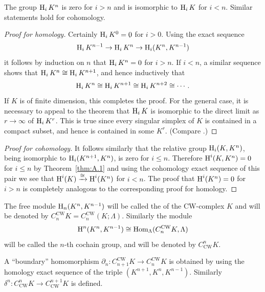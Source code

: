 \documentclass[../main]{subfiles}
\begin{document}
\begin{corollary}\label{cor:A.3}
The group $\operatorname{H}_i K^n$ is zero for $i>n$ and is isomorphic to $\operatorname{H}_i K$ for $i<n$. Similar statements hold for cohomology.
\end{corollary}

\begin{proof}[Proof for homology]
Certainly $\operatorname{H}_i K^0 = 0$ for $i>0$. Using the exact sequence \[\operatorname{H}_i K^{n-1} \rightarrow \operatorname{H}_i K^n \rightarrow \operatorname{H}_i (K^n, K^{n-1})\] it follows by induction on $n$ that $\operatorname{H}_i K^n = 0$ for $i>n$. If $i<n$, a similar sequence shows that $\operatorname{H}_i K^n \cong \operatorname{H}_i K^{n+1}$, and hence inductively that \[\operatorname{H}_i K^n \cong \operatorname{H}_i K^{n+1} \cong \operatorname{H}_i K^{n+2} \cong \cdots .\] If $K$ is of finite dimension, this completes the proof. For the general case, it is necessary to appeal to the theorem that $\operatorname{H}_i K$ is isomorphic to the direct limit as $r\rightarrow \infty$ of $\operatorname{H}_i K^r$. This is true since every singular simplex of $K$ is contained in a compact subset, and hence is contained in some $K^r$. (Compare \newline \cite[Section 5(D)]{whitehead1949}.)
\end{proof}
\begin{proof}[Proof for cohomology]
It follows similarly that the relative group $\operatorname{H}_i (K, K^n)$, being isomorphic to $\operatorname{H}_i (K^{n+1}, K^n)$, is zero for $i \leq n$. Therefore $\operatorname{H}^i (K, K^n)= 0$ for $i \leq n$ by Theorem~\ref{thm:A.1} and using the cohomology exact sequence of this pair we see that $\operatorname{H}^i (K) \xrightarrow{\cong} \operatorname{H}^i (K^n)$ for $i<n$. The proof that $\operatorname{H}^i (K^n)=0$ for $i>n$ is completely analogous to the corresponding proof for homology.
\end{proof}
\begin{definition}
The free module $\operatorname{H}_n (K^n, K^{n-1})$ will be called the  of the CW-complex $K$ and will be denoted by $C^{\mathrm{CW}}_n K = C^{\mathrm{CW}}_n (K; \Lambda)$. Similarly the module \[\operatorname{H}^n (K^n, K^{n-1}) \cong \operatorname{Hom}_{\Lambda} (C^{\mathrm{CW}}_n K, \Lambda)\] will be called the $n$-th cochain group, and will be denoted by $C_{\mathrm{CW}}^n K$.
\end{definition}
A ``boundary'' homomorphism $\partial_n : C^{\mathrm{CW}}_{n+1} K \rightarrow C^{\mathrm{CW}}_{n} K$ is obtained by using the homology exact sequence of the triple $(K^{n+1} , K^n, K^{n-1})$. Similarly\newline ${\delta}^n: C_{\mathrm{CW}}^n K \rightarrow C_{\mathrm{CW}}^{n+1} K$ is defined.
\end{document}

